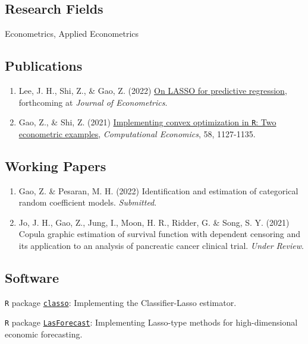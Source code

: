 \documentclass[letterpaper]{article}
\renewenvironment{itemize}{
  \begin{list}{}{
    \setlength{\leftmargin}{1.5em}
    \setlength{\itemsep}{0.25em}
    \setlength{\parskip}{0pt}
    \setlength{\parsep}{0.25em}
  }
}{
  \end{list}
}
\begin{document}
\subsection*{\bf Research Fields}
\begin{itemize}
  \item Econometrics, Applied Econometrics
\end{itemize}


\subsection*{\bf Publications}
\begin{enumerate}
  \item Lee, J. H., Shi, Z., \& Gao, Z. (2022) \href{https://www.sciencedirect.com/science/article/pii/S030440762100049X}{On LASSO for predictive regression}, forthcoming at \textit{Journal of Econometrics}.
  \item Gao, Z., \& Shi, Z. (2021) \href{https://link.springer.com/article/10.1007/s10614-020-09995-z}{Implementing convex optimization in {\tt R}: Two econometric examples}, {\it Computational Economics}, 58, 1127-1135.
\end{enumerate}

\subsection*{\bf Working Papers}
\begin{enumerate}[resume]
  \item  Gao, Z. \& Pesaran, M. H. (2022) Identification and estimation of categorical random coefficient models. \textit{Submitted}.
  \item  Jo, J. H., Gao, Z., Jung, I., Moon, H. R., Ridder, G. \& Song, S. Y. (2021)  Copula graphic estimation of survival function with dependent censoring and its application to an analysis of pancreatic cancer clinical trial. \textit{Under Review}.
\end{enumerate}


\subsection*{\bf Software}

\begin{itemize}
  \item \texttt{R} package \href{https://github.com/zhan-gao/classo}{{\texttt{classo}}}: Implementing the Classifier-Lasso estimator.
  \item \texttt{R} package \href{https://github.com/zhan-gao/LasForecast}{{\texttt{LasForecast}}}: Implementing Lasso-type methods for high-dimensional economic forecasting.
\end{itemize}
\end{document}
